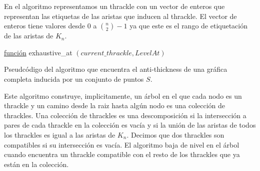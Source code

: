   En el algoritmo representamos un thrackle con un vector de enteros que representan las etiquetas de las
  aristas que inducen al thrackle. El vector de enteros tiene valores desde $0$ a $\binom{n}{2}-1$ ya que
  este es el rango de etiquetación de las aristas de $K_n$.
  \begin{algorithm}[p]
    \DontPrintSemicolon
    \underline{función} exhaustive\_at $ (current\_thrackle,LevelAt) $\;
    \caption{Pseudcódigo del algoritmo que encuentra el anti-thickness de una gráfica completa inducida por
    un conjunto de puntos $S$.}
    \label{algo_exhaustive_at}
  \end{algorithm}

  Este algoritmo construye, implicitamente, un árbol en el que cada nodo es un thrackle y un camino desde
  la raiz hasta algún nodo es una colección de thrackles. Una colección de thrackles es una descomposición
  si la intersección a pares de cada thrackle en la colección es vacía y si la unión de las aristas de
  todos los thrackles es igual a las aristas de $K_n$. Decimos que dos thrackles son compatibles si su
  intersección es vacía. El algoritmo baja de nivel en el árbol cuando encuentra un thrackle compatible con
  el resto de los thrackles que ya están en la colección.

